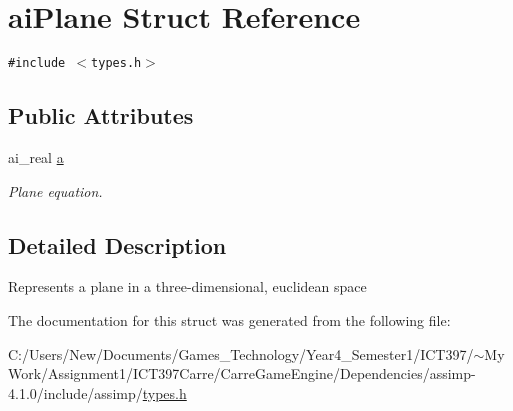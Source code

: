 \hypertarget{structai_plane}{
\section{aiPlane Struct Reference}
\label{structai_plane}
}
{\tt \#include $<$types.h$>$}

\subsection*{Public Attributes}
\begin{CompactItemize}
\item 
\hypertarget{structai_plane_0e2f46be0d810fef7633c9d4b77c5556}{
ai\_\-real \hyperlink{structai_plane_0e2f46be0d810fef7633c9d4b77c5556}{a}}
\label{structai_plane_0e2f46be0d810fef7633c9d4b77c5556}

\begin{CompactList}\small\item\em Plane equation. \item\end{CompactList}\end{CompactItemize}


\subsection{Detailed Description}
Represents a plane in a three-dimensional, euclidean space 

The documentation for this struct was generated from the following file:\begin{CompactItemize}
\item 
C:/Users/New/Documents/Games\_\-Technology/Year4\_\-Semester1/ICT397/$\sim$My Work/Assignment1/ICT397Carre/CarreGameEngine/Dependencies/assimp-4.1.0/include/assimp/\hyperlink{types_8h}{types.h}\end{CompactItemize}
